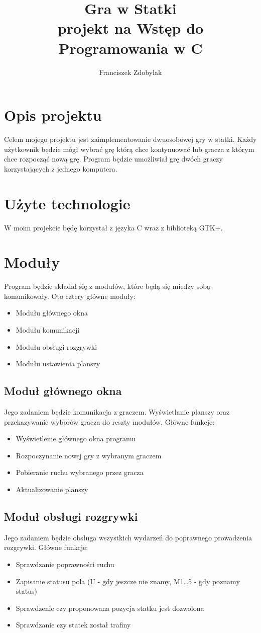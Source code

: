 \documentclass[a4paper]{article}
\author{Franciszek Zdobylak}
\title{\Huge{\bf{Gra w Statki}}\\
				\small projekt na Wstęp do Programowania w C}
\begin{document}
\maketitle

\section{Opis projektu}

Celem mojego projektu jest zaimplementowanie dwuosobowej gry w statki. Każdy użytkownik będzie mógł wybrać grę którą chce kontynuować lub gracza z którym chce rozpocząć nową grę.
Program będzie umożliwiał grę dwóch graczy korzystających z jednego komputera.

\section{Użyte technologie}
W moim projekcie będę korzystał z języka C wraz z biblioteką GTK+.

\section{Moduły}
Program będzie składał się z modułów, które będą się między sobą komunikowały. Oto cztery główne moduły:
\begin{itemize}
	\item Modułu głównego okna
	\item Modułu komunikacji
	\item Modułu obsługi rozgrywki
	\item Modułu ustawienia planszy
\end{itemize}

\subsection{Moduł głównego okna}
Jego zadaniem będzie komunikacja z graczem. Wyświetlanie planszy oraz przekazywanie wyborów gracza do reszty modułów.
Główne funkcje:
\begin{itemize}
	\item Wyświetlenie głównego okna programu
	\item Rozpoczynanie nowej gry z wybranym graczem
	\item Pobieranie ruchu wybranego przez gracza
	\item Aktualizowanie planszy
\end{itemize}

\subsection{Moduł obsługi rozgrywki}
Jego zadaniem będzie obsługa wszystkich wydarzeń do poprawnego prowadzenia rozgrywki.
Główne funkcje:
\begin{itemize}
	\item Sprawdzanie poprawności ruchu
	\item Zapisanie statusu pola (U - gdy jeszcze nie znamy, M1\dots5 - gdy poznamy status)
	\item Sprawdzenie czy proponowana pozycja statku jest dozwolona
	\item Sprawdzanie czy statek został trafiny
\end{itemize}
\end{document}
